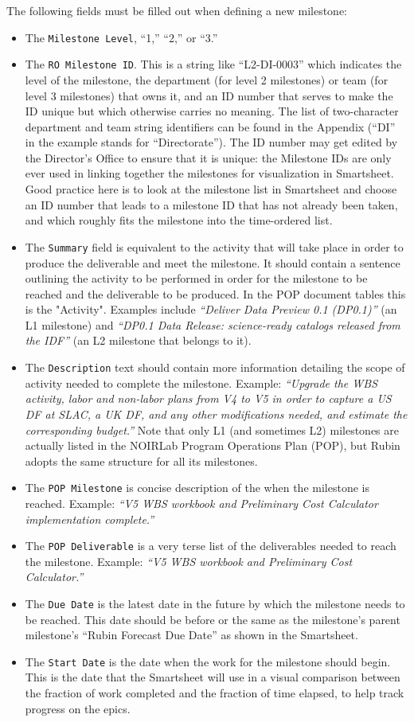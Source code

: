 The following fields must be filled out when defining a new milestone:
\begin{itemize}
\item The \texttt{Milestone Level}, ``1,'' ``2,'' or ``3.''
\item The \texttt{RO Milestone ID}.
  This is a string like ``L2-DI-0003'' which indicates the level of the milestone, the department (for level 2 milestones) or team (for level 3 milestones) that owns it, and an ID number that serves to make the ID unique but which otherwise carries no meaning.
  The list of two-character department and team string identifiers can be found in the Appendix (``DI'' in the example stands for ``Directorate'').
  The ID number may get edited by the Director's Office to ensure that it is unique: the Milestone IDs are only ever used in linking together the milestones for visualization in Smartsheet.
  Good practice here is to look at the milestone list in Smartsheet and choose an ID number that leads to a milestone ID that has not already been taken, and which roughly fits the milestone into the time-ordered list.
\item The \texttt{Summary} field is equivalent to the activity that will take place in order to produce the deliverable and meet the milestone.  It should contain a sentence outlining the activity to be performed in order for the milestone to be reached and the deliverable to be produced. In the POP document tables this is the "Activity".
  Examples include \textit{``Deliver Data Preview 0.1 (DP0.1)''} (an L1 milestone) and \textit{``DP0.1 Data Release: science-ready catalogs released from the IDF''} (an L2 milestone that belongs to it).
\item The \texttt{Description} text should contain more information detailing the scope of activity needed to complete the milestone.
  Example: \textit{``Upgrade the WBS activity, labor and non-labor plans from V4 to V5 in order to capture a US DF at SLAC, a UK DF, and any other modifications needed, and estimate the corresponding budget.''}
  Note that only L1 (and sometimes L2) milestones are actually listed in the NOIRLab Program Operations Plan (POP), but Rubin adopts the same structure for all its milestones.
\item The \texttt{POP Milestone} is concise description of the when the milestone is reached.
Example: \textit{``V5 WBS workbook and Preliminary Cost Calculator implementation complete.''}
\item The \texttt{POP Deliverable} is a very terse list of the deliverables needed to reach the milestone.
  Example: \textit{``V5 WBS workbook and Preliminary Cost Calculator.''}
\item The \texttt{Due Date} is the latest date in the future by which the milestone needs to be reached.
  This date should be before or the same as the milestone's parent milestone's ``Rubin Forecast Due Date'' as shown in the Smartsheet.
\item The \texttt{Start Date} is the date when the work for the milestone should begin.
  This is the date that the Smartsheet will use in a visual comparison between the fraction of work completed and the fraction of time elapsed, to help track progress on the epics.
\end{itemize}


